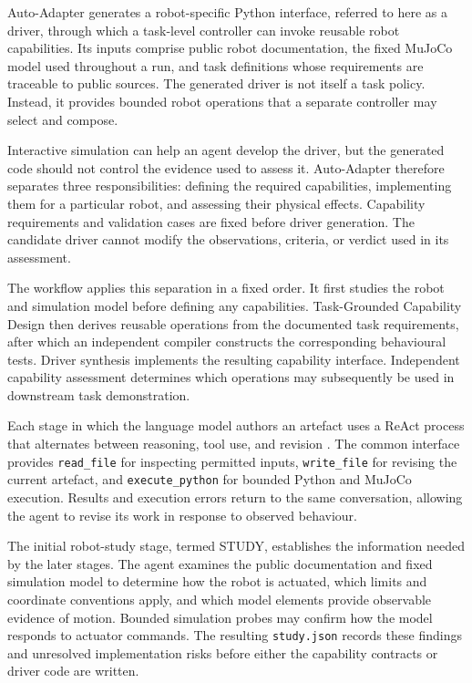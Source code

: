 Auto-Adapter generates a robot-specific Python interface, referred to here as
a driver, through which a task-level controller can invoke reusable robot
capabilities. Its inputs comprise public robot documentation, the fixed MuJoCo
model used throughout a run, and task definitions whose requirements are
traceable to public sources. The generated driver is not itself a task policy.
Instead, it provides bounded robot operations that a separate controller may
select and compose.

Interactive simulation can help an agent develop the driver, but the generated
code should not control the evidence used to assess it. Auto-Adapter therefore
separates three responsibilities: defining the required capabilities,
implementing them for a particular robot, and assessing their physical effects.
Capability requirements and validation cases are fixed before driver
generation. The candidate driver cannot modify the observations, criteria, or
verdict used in its assessment.

The workflow applies this separation in a fixed order. It first studies the
robot and simulation model before defining any capabilities. Task-Grounded
Capability Design then derives reusable operations from the documented task
requirements, after which an independent compiler constructs the corresponding
behavioural tests. Driver synthesis implements the resulting capability
interface. Independent capability assessment determines which operations may
subsequently be used in downstream task demonstration.

Each stage in which the language model authors an artefact uses a ReAct process
that alternates between reasoning, tool use, and revision
\citep{yao2023react}. The common interface provides
\texttt{read\_file} for inspecting permitted inputs,
\texttt{write\_file} for revising the current artefact, and
\texttt{execute\_python} for bounded Python and MuJoCo execution. Results and
execution errors return to the same conversation, allowing the agent to revise
its work in response to observed behaviour.

The initial robot-study stage, termed STUDY, establishes the information needed
by the later stages. The agent examines the public documentation and fixed
simulation model to determine how the robot is actuated, which limits and
coordinate conventions apply, and which model elements provide observable
evidence of motion. Bounded simulation probes may confirm how the model
responds to actuator commands. The resulting \texttt{study.json} records these
findings and unresolved implementation risks before either the capability
contracts or driver code are written.

